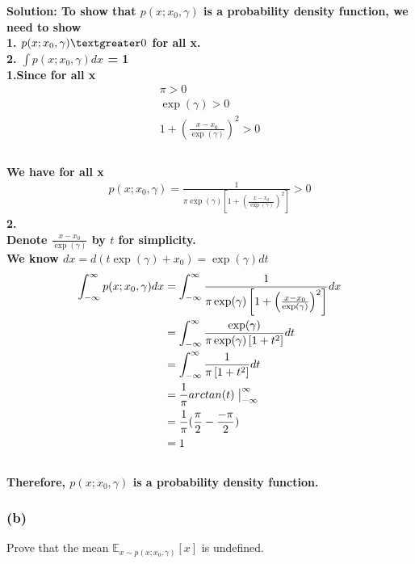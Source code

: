\documentclass[11pt]{article}
\begin{document}
	{\noindent \bf Solution: 
	To show that $p( x ; x_0, \gamma )$ is a probability density function, we need to show
	\ \\
	1. $p( x ; x_0, \gamma ) \textgreater 0$ for all x.
	\ \\
	2. $\int p( x ; x_0, \gamma )dx$ = 1
	\ \\
	1.Since for all x
	\begin{gather*}
	    \pi > 0 \\
        \exp(\gamma) > 0 \\
        	1 + \left( \frac{x - x_0}{\exp(\gamma)} \right)^2 > 0 \\
    \end{gather*}
	\ \\
	We have for all x
	\begin{gather}
	    p( x ; x_0, \gamma )= \frac{1}{\pi\exp( \gamma) \left [ 
	1 + \left( \frac{x - x_0}{\exp(\gamma)} \right)^2 \right ]} >0
	\end{gather}
	2.
	\ \\
	Denote $\frac{x-x_0}{\exp(\gamma)}$ by $t$ for simplicity. 
	\ \\
	We know $dx = d(t\exp(\gamma)+x_0)=\exp(\gamma)dt$
    \begin{equation}
        \begin{split}
            \int_{-\infty}^{\infty} p( x ; x_0, \gamma )dx&=\int_{-\infty}^{\infty} \frac{1}{\pi\exp( \gamma) \left [ 
	1 + \left( \frac{x - x_0}{\exp(\gamma)} \right)^2 \right ]}dx\\
	&= \int_{-\infty}^{\infty} \frac{\exp(\gamma)}{\pi\exp( \gamma) \left [ 
	1 + t^2 \right]} dt\\
	&= \int_{-\infty}^{\infty} \frac{1}{\pi \left [ 
	1 + t^2 \right]} dt\\
	&= \frac{1}{\pi}arctan(t)\bigm|_{-\infty}^{\infty}\\
	&= \frac{1}{\pi}(\frac{\pi}{2}-\frac{-\pi}{2}) \\
	&= 1
        \end{split}
    \end{equation}
    \ \\
    Therefore, $p( x ; x_0, \gamma )$ is a probability density function.
	}
	
	\vfill
	
	\subsubsection*{(b)}
	Prove that the mean $\mathbb{E}_{x \sim p( x ; x_0, \gamma )} \left [x \right ]$ is undefined.
	
\end{document}
